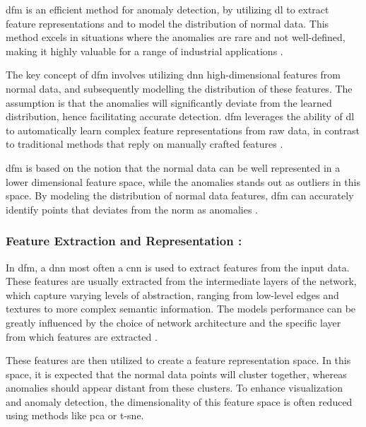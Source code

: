 \gls{dfm} is an efficient method for anomaly detection, by utilizing \gls{dl} to extract feature representations and to model the distribution of normal data. This method excels in situations where the anomalies are rare and not well-defined, making it highly valuable for a range of industrial applications \cite{ahuja2019probabilisticmodelingdeepfeatures}.

The key concept of \gls{dfm} involves utilizing \gls{dnn} high-dimensional features from normal data, and subsequently modelling the distribution of these features. The assumption is that the anomalies will significantly deviate from the learned distribution, hence facilitating accurate detection. \gls{dfm} leverages the ability of \gls{dl} to automatically learn complex feature representations from raw data, in contrast to traditional methods that reply on manually crafted features \cite{ahuja2019probabilisticmodelingdeepfeatures}.

\gls{dfm} is based on the notion that the normal data can be well represented in a lower dimensional feature space, while the anomalies stands out as outliers in this space. By modeling the distribution of normal data features, \gls{dfm} can accurately identify points that deviates from the norm as anomalies \cite{ahuja2019probabilisticmodelingdeepfeatures}.

\subsubsection*{Feature Extraction and Representation :}

In \gls{dfm}, a \gls{dnn} most often a \gls{cnn} is used to extract features from the input data. These features are usually extracted from the intermediate layers of the network, which capture varying levels of abstraction, ranging from low-level edges and textures to more complex semantic information. The models performance can be greatly influenced by the choice of network architecture and the specific layer from which features are extracted \cite{8954181}.

These features are then utilized to create a feature representation space. In this space, it is expected that the normal data points will cluster together, whereas anomalies should appear distant from these clusters. To enhance visualization and anomaly detection\cite{ahuja2019probabilisticmodelingdeepfeatures}, the dimensionality of this feature space is often reduced using methods like \gls{pca}\cite{Bishop2006} or \gls{t-sne}\cite{JMLR:v9:vandermaaten08a}.

